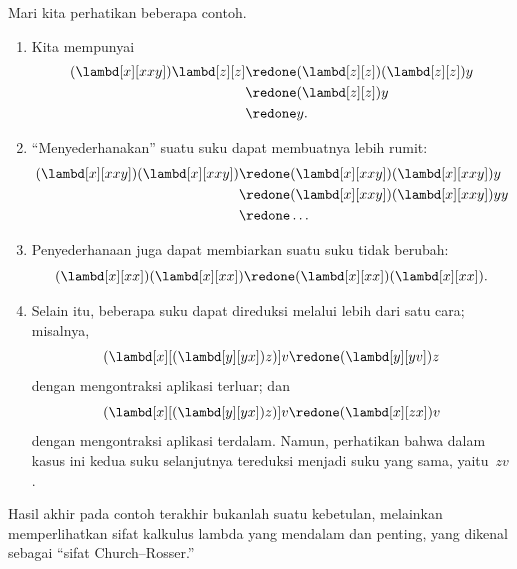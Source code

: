 \documentclass[../../../include/open-logic-section]{subfiles}
\begin{document}
Mari kita perhatikan beberapa contoh.
\begin{enumerate}
\item Kita mempunyai
\begin{align*}
(\lambd[x][xxy]) \lambd[z][z] & \redone (\lambd[z][z])(\lambd[z][z]) y \\
& \redone (\lambd[z][z]) y \\
& \redone y.
\end{align*}
\item ``Menyederhanakan'' suatu suku dapat membuatnya lebih rumit:
\begin{align*}
(\lambd[x][xxy])(\lambd[x][xxy]) & \redone (\lambd[x][xxy])(\lambd[x][xxy])y \\
& \redone (\lambd[x][xxy])(\lambd[x][xxy])yy \\
& \redone \dots
\end{align*}
\item Penyederhanaan juga dapat membiarkan suatu suku tidak berubah:
\[
(\lambd[x][xx])(\lambd[x][xx]) \redone (\lambd[x][xx])(\lambd[x][xx]).
\]
\item Selain itu, beberapa suku dapat direduksi melalui lebih dari satu cara;
  misalnya,
\[
(\lambd[x][(\lambd[y][yx]) z)] v \redone (\lambd[y][yv]) z
\]
dengan mengontraksi aplikasi terluar; dan
\[
(\lambd[x][(\lambd[y][yx]) z)] v \redone (\lambd[x][zx]) v
\]
dengan mengontraksi aplikasi terdalam. Namun, perhatikan bahwa dalam kasus ini
kedua suku selanjutnya tereduksi menjadi suku yang sama, yaitu~$zv$.
\end{enumerate}

Hasil akhir pada contoh terakhir bukanlah suatu kebetulan, melainkan
memperlihatkan sifat kalkulus lambda yang mendalam dan penting, yang dikenal
sebagai ``sifat Church--Rosser.''
\end{document}

